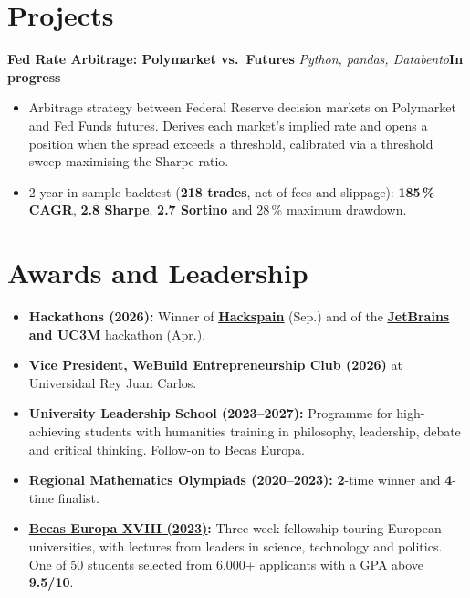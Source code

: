 \documentclass[10pt,letterpaper]{article}
\newenvironment{cvblock}{%
  \begin{list}{}{%
    \setlength{\leftmargin}{10.8pt}%
    \setlength{\rightmargin}{5.4pt}%
    \setlength{\topsep}{0pt}%
    \setlength{\partopsep}{0pt}%
    \setlength{\parsep}{0pt}%
    \setlength{\itemsep}{0pt}%
  }\item[]%
}{\end{list}}
\newcommand{\cvproject}[3]{%
  {\fontsize{11}{13}\selectfont\textbf{#1}\,\textbar\,\textit{#2}\hfill\hspace{1em}\textbf{#3}\par}%
}
\newenvironment{cvbullets}{%
  \begin{itemize}[leftmargin=24pt,label=\textbullet,
    labelsep=5pt,itemsep=1pt,topsep=1pt,parsep=0pt,partopsep=0pt]%
}{\end{itemize}}
\begin{document}
\section{Projects}
\begin{cvblock}
  \cvproject{Fed Rate Arbitrage: Polymarket vs.\ Futures}
    {Python, pandas, Databento}{In progress}
  \begin{cvbullets}
    \item Arbitrage strategy between Federal Reserve decision markets on Polymarket and Fed Funds futures. Derives each market's implied rate and opens a position when the spread exceeds a threshold, calibrated via a threshold sweep maximising the Sharpe ratio.
    \item 2-year in-sample backtest (\textbf{218 trades}, net of fees and slippage): \textbf{185\,\% CAGR}, \textbf{2.8 Sharpe}, \textbf{2.7 Sortino} and 28\,\% maximum drawdown.
  \end{cvbullets}
\end{cvblock}

\section{Awards and Leadership}
\begin{cvblock}
  \begin{cvbullets}
    \item \textbf{Hackathons (2026):} Winner of \href{https://lnkd.in/p/eifTBpXn}{\underline{\textbf{Hackspain}}} (Sep.) and of the \href{https://lnkd.in/p/emWiMK5R}{\underline{\textbf{JetBrains and UC3M}}} hackathon (Apr.).
    \item \textbf{Vice President, WeBuild Entrepreneurship Club (2026)} at Universidad Rey Juan Carlos.
    \item \textbf{University Leadership School (2023--2027):} Programme for high-achieving students with humanities training in philosophy, leadership, debate and critical thinking. Follow-on to Becas Europa.
    \item \textbf{Regional Mathematics Olympiads (2020--2023):} \textbf{2}-time winner and \textbf{4}-time finalist.
    \item \href{https://www.diariodeburgos.es/noticia/ze412122f-0175-d486-dbf315234ef7e036/202306/un-alumno-de-10-que-busca-el-135}{\underline{\textbf{Becas Europa XVIII (2023)}}}\textbf{:} Three-week fellowship touring European universities, with lectures from leaders in science, technology and politics. One of 50 students selected from 6,000+ applicants with a GPA above \textbf{9.5/10}. 
  \end{cvbullets}
\end{cvblock}
\end{document}
